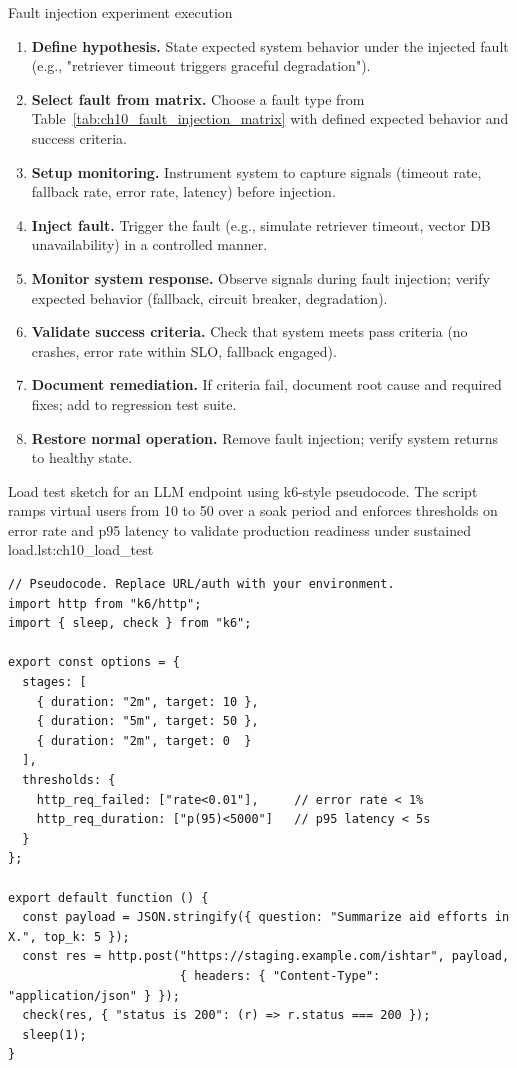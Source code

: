 \begin{llmalgobox}{Fault injection experiment execution}
\label{alg:ch10_fault_injection_experiment}
\begin{enumerate}[leftmargin=1.6em, itemsep=3pt]
    \item \textbf{Define hypothesis.} State expected system behavior under the injected fault (e.g., "retriever timeout triggers graceful degradation").
    \item \textbf{Select fault from matrix.} Choose a fault type from Table~\ref{tab:ch10_fault_injection_matrix} with defined expected behavior and success criteria.
    \item \textbf{Setup monitoring.} Instrument system to capture signals (timeout rate, fallback rate, error rate, latency) before injection.
    \item \textbf{Inject fault.} Trigger the fault (e.g., simulate retriever timeout, vector DB unavailability) in a controlled manner.
    \item \textbf{Monitor system response.} Observe signals during fault injection; verify expected behavior (fallback, circuit breaker, degradation).
    \item \textbf{Validate success criteria.} Check that system meets pass criteria (no crashes, error rate within SLO, fallback engaged).
    \item \textbf{Document remediation.} If criteria fail, document root cause and required fixes; add to regression test suite.
    \item \textbf{Restore normal operation.} Remove fault injection; verify system returns to healthy state.
\end{enumerate}
\end{llmalgobox}

\begin{codebox}{Load test sketch for an LLM endpoint using k6-style pseudocode. The script ramps virtual users from 10 to 50 over a soak period and enforces thresholds on error rate and p95 latency to validate production readiness under sustained load.}{lst:ch10_load_test}
\begin{verbatim}
// Pseudocode. Replace URL/auth with your environment.
import http from "k6/http";
import { sleep, check } from "k6";

export const options = {
  stages: [
    { duration: "2m", target: 10 },
    { duration: "5m", target: 50 },
    { duration: "2m", target: 0  }
  ],
  thresholds: {
    http_req_failed: ["rate<0.01"],     // error rate < 1%
    http_req_duration: ["p(95)<5000"]   // p95 latency < 5s
  }
};

export default function () {
  const payload = JSON.stringify({ question: "Summarize aid efforts in X.", top_k: 5 });
  const res = http.post("https://staging.example.com/ishtar", payload,
                        { headers: { "Content-Type": "application/json" } });
  check(res, { "status is 200": (r) => r.status === 200 });
  sleep(1);
}
\end{verbatim}
\end{codebox}

